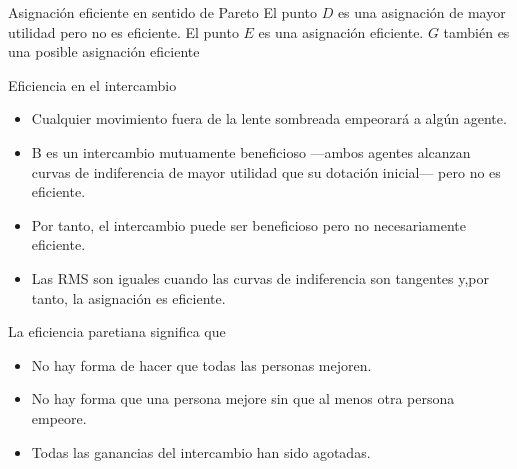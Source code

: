 \begin{frame}{Asignación eficiente en sentido de Pareto}
	El punto $D$ es una asignación de mayor utilidad pero no es eficiente. El punto $E$ es una asignación eficiente. $G$ también es una posible asignación eficiente \\
		\vspace{-0.6cm}
	
\end{frame}
\begin{frame}{Eficiencia en el intercambio}
	\begin{itemize}
		\item Cualquier movimiento fuera de la lente sombreada empeorará a algún agente.
		\item B es un intercambio mutuamente beneficioso —ambos agentes alcanzan curvas de indiferencia de mayor utilidad que su dotación inicial— pero no es eficiente.
		\item Por tanto, el intercambio puede ser beneficioso pero no necesariamente eficiente.
		\item Las RMS son iguales cuando las curvas de indiferencia son tangentes y,por tanto, la asignación es eficiente.
	\end{itemize}
\end{frame}
\begin{frame}{La eficiencia paretiana significa que}
	\begin{itemize}
		\item No hay forma de hacer que todas las personas mejoren.
		\item No hay forma que una persona mejore sin que al menos otra persona empeore.
		\item Todas las ganancias del intercambio han sido agotadas.
	\end{itemize}
\end{frame}
